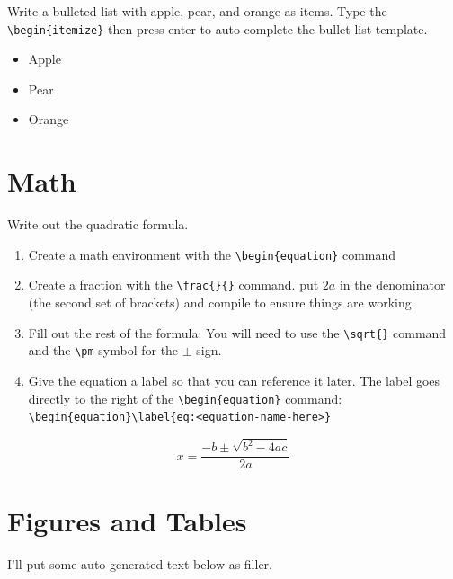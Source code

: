         Write a bulleted list with apple, pear, and orange as items. Type the \verb"\begin{itemize}" then press enter to auto-complete the bullet list template.

        \begin{itemize}
            \item Apple
            \item Pear
            \item Orange
        \end{itemize}

    \section{Math}
        Write out the quadratic formula.
        \begin{enumerate}
            \item Create a math environment with the \verb"\begin{equation}" command
            \item Create a fraction with the \verb"\frac{}{}" command. put $2a$ in the denominator (the second set of brackets) and compile to ensure things are working.
            \item Fill out the rest of the formula. You will need to use the \verb"\sqrt{}" command and the \verb"\pm" symbol for the $\pm$ sign.
            \item Give the equation a label so that you can reference it later. The label goes directly to the right of the \verb"\begin{equation}" command: \verb"\begin{equation}\label{eq:<equation-name-here>}"
        \end{enumerate}


        \begin{equation}\label{eq:quadratic}
            x = \frac{-b \pm \sqrt{b^2 - 4ac}}{2a}
        \end{equation}



    \section{Figures and Tables}
        I'll put some auto-generated text below as filler.

        \lipsum[1]\\

